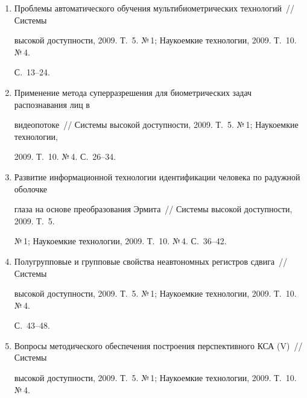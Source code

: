 \begin{enumerate}[1.]
высокой доступности, 2009. Т.~5. №\,1; Наукоемкие технологии, 2009. Т.~10. №\,4. 


С.~5--12.





\item {}


Проблемы автоматического обучения мультибиометрических технологий~// Системы 


высокой до\-ступ\-ности, 2009. Т.~5. №\,1; Наукоемкие технологии, 2009. Т.~10. №\,4. 


С.~13--24.





\item {}


Применение метода суперразрешения для биометрических задач распознавания лиц в 


видеопотоке~// Системы высокой доступности, 2009. Т.~5. №\,1; Наукоемкие технологии, 


2009. Т.~10. №\,4. С.~26--34.





\item {}


Развитие информационной технологии идентификации человека по радужной оболочке 


глаза на основе преобразования Эрмита~// Системы высокой доступности, 2009. Т.~5. 


№\,1; Наукоемкие технологии, 2009. Т.~10. №\,4. С.~36--42.





\item {}


Полугрупповые и групповые свойства неавтономных регистров сдвига~// Системы 


высокой доступности, 2009. Т.~5. №\,1; Наукоемкие технологии, 2009. Т.~10. №\,4. 


С.~43--48.





\item {}


Вопросы методического обеспечения по\-стро\-ения перспективного КСА (V)~// Системы 


высокой до\-ступ\-ности, 2009. Т.~5. №\,1; Наукоемкие технологии, 2009. Т.~10. №\,4. 



\end{enumerate}
